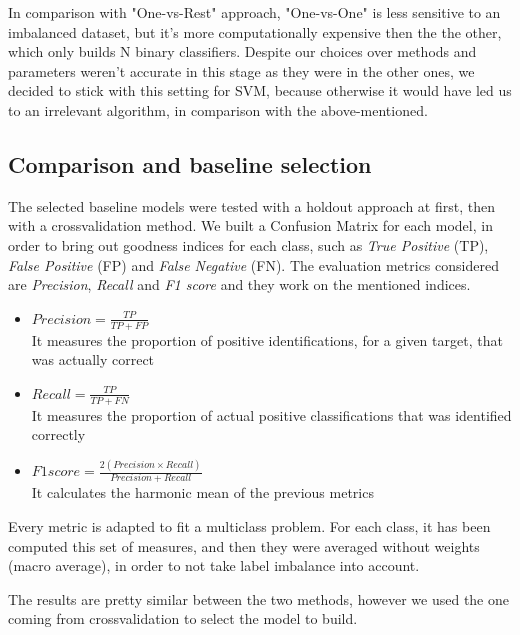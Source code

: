 In comparison with "One-vs-Rest" approach, "One-vs-One" is less sensitive to an imbalanced dataset, but it's more computationally expensive then the the other, which only builds N binary classifiers.
Despite our choices over methods and parameters weren't accurate in this stage as they were in the other ones, we decided to stick with this setting for SVM, because otherwise it would have led us to an irrelevant algorithm, in comparison with the above-mentioned.

\subsection{Comparison and baseline selection}
The selected baseline models were tested with a holdout approach at first, then with a crossvalidation method.
We built a Confusion Matrix for each model, in order to bring out goodness indices for each class, such as \textit{True Positive} (TP), \textit{False Positive} (FP) and \textit{False Negative} (FN).
The evaluation metrics considered are \textit{Precision}, \textit{Recall} and \textit{F1 score} and they work on the mentioned indices.
\begin{itemize}
	\item[\PencilRight] $ Precision = \frac{TP}{TP+FP} $\\
	It measures the proportion of positive identifications, for a given target, that was actually correct
	\item[\PencilRight] $ Recall = \frac{TP}{TP+FN} $\\
	It measures the proportion of actual positive classifications that was identified correctly
	\item[\PencilRight] $ F1 score = \frac{2(Precision \times Recall )}{Precision+Recall} $\\
	It calculates the harmonic mean of the previous metrics
\end{itemize}
Every metric is adapted to fit a multiclass problem. For each class, it has been computed this set of measures, and then they were averaged without weights (macro average), in order to not take label imbalance into account.

The results are pretty similar between the two methods, however we used the one coming from crossvalidation to select the model to build.
